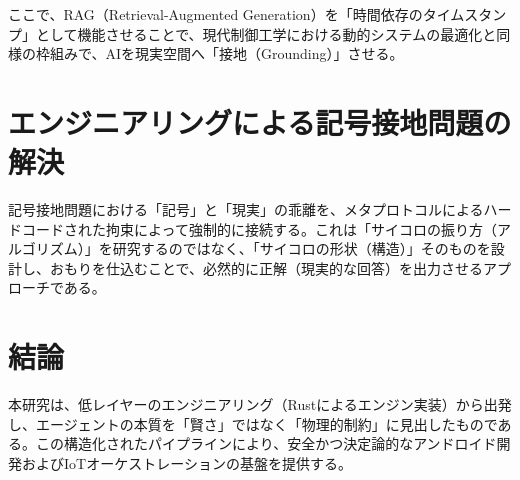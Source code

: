 \documentclass[article, 12pt]{article}
\begin{document}
ここで、RAG（Retrieval-Augmented Generation）を「時間依存のタイムスタンプ」として機能させることで、現代制御工学における動的システムの最適化と同様の枠組みで、AIを現実空間へ「接地（Grounding）」させる。

\section{エンジニアリングによる記号接地問題の解決}
記号接地問題における「記号」と「現実」の乖離を、メタプロトコルによるハードコードされた拘束によって強制的に接続する。これは「サイコロの振り方（アルゴリズム）」を研究するのではなく、「サイコロの形状（構造）」そのものを設計し、おもりを仕込むことで、必然的に正解（現実的な回答）を出力させるアプローチである。

\section{結論}
本研究は、低レイヤーのエンジニアリング（Rustによるエンジン実装）から出発し、エージェントの本質を「賢さ」ではなく「物理的制約」に見出したものである。この構造化されたパイプラインにより、安全かつ決定論的なアンドロイド開発およびIoTオーケストレーションの基盤を提供する。
\end{document}
